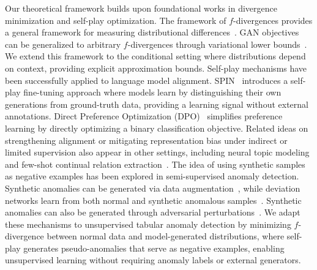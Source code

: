 Our theoretical framework builds upon foundational works in divergence minimization and self-play optimization. The framework of $f$-divergences provides a general framework for measuring distributional differences~\cite{Csiszar2004, Liese2006}. GAN objectives can be generalized to arbitrary $f$-divergences through variational lower bounds~\cite{nowozin2016f}. We extend this framework to the conditional setting where distributions depend on context, providing explicit approximation bounds. Self-play mechanisms have been successfully applied to language model alignment. SPIN~\cite{chen2024self} introduces a self-play fine-tuning approach where models learn by distinguishing their own generations from ground-truth data, providing a learning signal without external annotations. Direct Preference Optimization (DPO)~\cite{rafailov2024directpreferenceoptimizationlanguage} simplifies preference learning by directly optimizing a binary classification objective. Related ideas on strengthening alignment or mitigating representation bias under indirect or limited supervision also appear in other settings, including neural topic modeling and few-shot continual relation extraction~\citep{hoang2025hicot, pham2025mitigating}. The idea of using synthetic samples as negative examples has been explored in semi-supervised anomaly detection. Synthetic anomalies can be generated via data augmentation~\cite{ruff2019deep}, while deviation networks learn from both normal and synthetic anomalous samples~\cite{pang2019deep}. Synthetic anomalies can also be generated through adversarial perturbations~\cite{ding2022catching}. We adapt these mechanisms to unsupervised tabular anomaly detection by minimizing $f$-divergence between normal data and model-generated distributions, where self-play generates pseudo-anomalies that serve as negative examples, enabling unsupervised learning without requiring anomaly labels or external generators.
